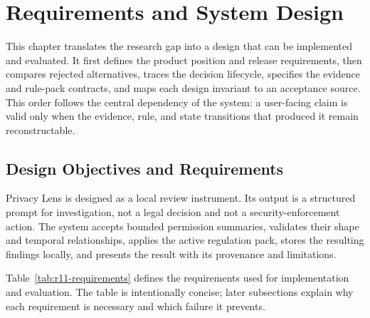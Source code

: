 \chapter{Requirements and System Design}

This chapter translates the research gap into a design that can be implemented and evaluated. It first defines the product position and release requirements, then compares rejected alternatives, traces the decision lifecycle, specifies the evidence and rule-pack contracts, and maps each design invariant to an acceptance source. This order follows the central dependency of the system: a user-facing claim is valid only when the evidence, rule, and state transitions that produced it remain reconstructable.

\section{Design Objectives and Requirements}

Privacy Lens is designed as a local review instrument. Its output is a structured prompt for investigation, not a legal decision and not a security-enforcement action. The system accepts bounded permission summaries, validates their shape and temporal relationships, applies the active regulation pack, stores the resulting findings locally, and presents the result with its provenance and limitations.

Table~\ref{tab:r11-requirements} defines the requirements used for implementation and evaluation. The table is intentionally concise; later subsections explain why each requirement is necessary and which failure it prevents.

